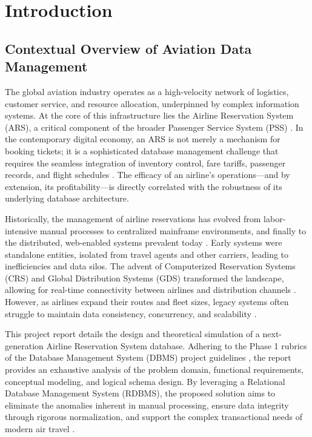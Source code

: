 \documentclass[12pt, a4paper]{article}
\begin{document}
	\tableofcontents
	\newpage
	
	\section{Introduction}
	
	\subsection{Contextual Overview of Aviation Data Management}
	The global aviation industry operates as a high-velocity network of logistics, customer service, and resource allocation, underpinned by complex information systems. At the core of this infrastructure lies the Airline Reservation System (ARS), a critical component of the broader Passenger Service System (PSS) \cite{ref1}. In the contemporary digital economy, an ARS is not merely a mechanism for booking tickets; it is a sophisticated database management challenge that requires the seamless integration of inventory control, fare tariffs, passenger records, and flight schedules \cite{ref2, ref3}. The efficacy of an airline's operations—and by extension, its profitability—is directly correlated with the robustness of its underlying database architecture.
	
	Historically, the management of airline reservations has evolved from labor-intensive manual processes to centralized mainframe environments, and finally to the distributed, web-enabled systems prevalent today \cite{ref4}. Early systems were standalone entities, isolated from travel agents and other carriers, leading to inefficiencies and data silos. The advent of Computerized Reservation Systems (CRS) and Global Distribution Systems (GDS) transformed the landscape, allowing for real-time connectivity between airlines and distribution channels \cite{ref5}. However, as airlines expand their routes and fleet sizes, legacy systems often struggle to maintain data consistency, concurrency, and scalability \cite{ref6}.
	
	This project report details the design and theoretical simulation of a next-generation Airline Reservation System database. Adhering to the Phase 1 rubrics of the Database Management System (DBMS) project guidelines \cite{ref7}, the report provides an exhaustive analysis of the problem domain, functional requirements, conceptual modeling, and logical schema design. By leveraging a Relational Database Management System (RDBMS), the proposed solution aims to eliminate the anomalies inherent in manual processing, ensure data integrity through rigorous normalization, and support the complex transactional needs of modern air travel \cite{ref8}.
	
\end{document}
